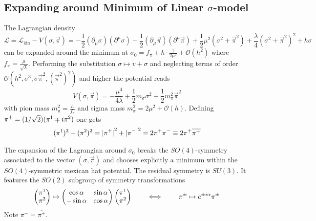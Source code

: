 \subsection{Expanding around Minimum of Linear $\sigma$-model}

The Lagrangian density
\begin{equation}
    \mathscr{L}=\mathcal{L}_{\text{kin}}-V(\sigma,\vec{\pi})=-\frac{1}{2}(\partial_\mu\sigma)(\partial^\mu\sigma)-\frac{1}{2}(\partial_\mu\vec{\pi})(\partial^\mu\vec{\pi})+\frac{1}{2}\mu^2(\sigma^2+\vec{\pi}^2)+\frac{\lambda}{4}(\sigma^2+\vec{\pi}^2)^2+h\sigma
\end{equation}
can be expanded around the minimum at $\sigma_0=f_\pi+h\cdot\frac{1}{2\mu^2}+\mathcal{O}(h^2)$ where $f_\pi=\frac{\mu}{\sqrt{\lambda}}$. Performing the substitution $\sigma\mapsto v+\sigma$ and neglecting terms of order $\mathcal{O}(h^2,\sigma^3,\sigma\vec{\pi}^2,(\vec{\pi}^2)^2)$ and higher the potential reads
\begin{equation}
    V(\sigma,\vec{\pi})=-\frac{\mu^4}{4\lambda}+\frac{1}{2}m_\sigma\sigma^2+\frac{1}{2}m_\pi^2\vec{\pi}^2
\end{equation}
with pion mass $m_\pi^2=\frac{h}{f_\pi}$ and sigma mass $m_\sigma^2=2\mu^2+\mathcal{O}(h)$. Defining $\pi^\pm=(1/\sqrt{2})(\pi^1\mp{i}\pi^2)$ one gets 
\begin{equation}
    (\pi^1)^2+(\pi^2)^2={\vert\pi^+\vert}^2+{\vert\pi^-\vert}^2=2\pi^+\pi^-\equiv 2\pi^+\overline{\pi^+}
\end{equation}

The expansion of the Lagrangian around $\sigma_0$ breaks the $SO(4)$-symmetry associated to the vector $(\sigma,\vec{\pi})$ and chooses explicitly a minimum within the $SO(4)$-symmetric mexican hat potential. The residual symmetry is $SU(3)$. It features the $SO(2)$ subgroup of symmetry transformations
\begin{equation}
    \begin{pmatrix}
        \pi^1\\\pi^2
    \end{pmatrix}
        \mapsto
        \begin{pmatrix}
            \cos\alpha&\sin\alpha\\-\sin\alpha&\cos\alpha
        \end{pmatrix}
        \begin{pmatrix}
            \pi^1\\\pi^2
        \end{pmatrix}
        \qquad\iff\qquad\pi^\pm\mapsto e^{\pm{i}\alpha}\pi^\pm
\end{equation}
Note $\pi^-=\overline{\pi^+}$.


